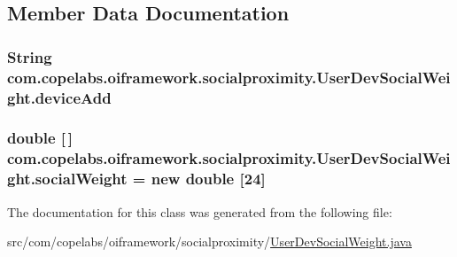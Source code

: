 \subsection{Member Data Documentation}
\hypertarget{classcom_1_1copelabs_1_1oiframework_1_1socialproximity_1_1_user_dev_social_weight_abacf5f84c5a33c950e0215e1d56b2b8a}{}
\subsubsection[{device\+Add}]{\setlength{\rightskip}{0pt plus 5cm}String com.\+copelabs.\+oiframework.\+socialproximity.\+User\+Dev\+Social\+Weight.\+device\+Add\hspace{0.3cm}{\ttfamily [private]}}\label{classcom_1_1copelabs_1_1oiframework_1_1socialproximity_1_1_user_dev_social_weight_abacf5f84c5a33c950e0215e1d56b2b8a}
\hypertarget{classcom_1_1copelabs_1_1oiframework_1_1socialproximity_1_1_user_dev_social_weight_a95cef9dcbf307bd6601c2e6baa47948e}{}
\subsubsection[{social\+Weight}]{\setlength{\rightskip}{0pt plus 5cm}double \mbox{[}$\,$\mbox{]} com.\+copelabs.\+oiframework.\+socialproximity.\+User\+Dev\+Social\+Weight.\+social\+Weight = new double \mbox{[}24\mbox{]}\hspace{0.3cm}{\ttfamily [private]}}\label{classcom_1_1copelabs_1_1oiframework_1_1socialproximity_1_1_user_dev_social_weight_a95cef9dcbf307bd6601c2e6baa47948e}


The documentation for this class was generated from the following file\+:\begin{DoxyCompactItemize}
\item 
src/com/copelabs/oiframework/socialproximity/\hyperlink{_user_dev_social_weight_8java}{User\+Dev\+Social\+Weight.\+java}\end{DoxyCompactItemize}
